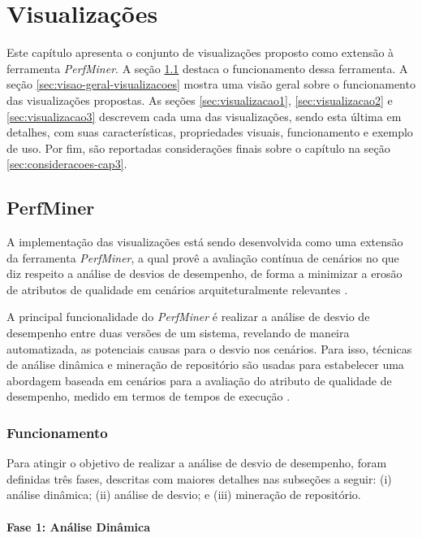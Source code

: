 \chapter{Visualizações} \label{ch:visualizacoes}

Este capítulo apresenta o conjunto de visualizações proposto como extensão à ferramenta \textit{PerfMiner}. A seção \ref{sec:perfminer} destaca o funcionamento dessa ferramenta. A seção \ref{sec:visao-geral-visualizacoes} mostra uma visão geral sobre o funcionamento das visualizações propostas. As seções \ref{sec:visualizacao1}, \ref{sec:visualizacao2} e \ref{sec:visualizacao3} descrevem cada uma das visualizações, sendo esta última em detalhes, com suas características, propriedades visuais, funcionamento e exemplo de uso. Por fim, são reportadas considerações finais sobre o capítulo na seção \ref{sec:consideracoes-cap3}.

\section{PerfMiner} \label{sec:perfminer}

A implementação das visualizações está sendo desenvolvida como uma extensão da ferramenta \textit{PerfMiner}, a qual provê a avaliação contínua de cenários no que diz respeito a análise de desvios de desempenho, de forma a minimizar a erosão de atributos de qualidade em cenários arquiteturalmente relevantes \cite{Pinto2015}.

A principal funcionalidade do \textit{PerfMiner} é realizar a análise de desvio de desempenho entre duas versões de um sistema, revelando de maneira automatizada, as potenciais causas para o desvio nos cenários. Para isso, técnicas de análise dinâmica e mineração de repositório são usadas para estabelecer uma abordagem baseada em cenários para a avaliação do atributo de qualidade de desempenho, medido em termos de tempos de execução \cite{Pinto2015}.

\subsection{Funcionamento} \label{subsec:funcionamento-perfminer}

Para atingir o objetivo de realizar a análise de desvio de desempenho, foram definidas três fases, descritas com maiores detalhes nas subseções a seguir: (i) análise dinâmica; (ii) análise de desvio; e (iii) mineração de repositório.

\subsubsection{Fase 1: Análise Dinâmica} \label{subsec:fase1}

